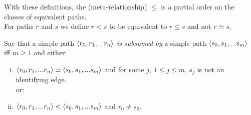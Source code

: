 \noindent With these definitions,  the (meta-relationship) $\leq$ is a partial order on the classes of equivalent paths. \\

\noindent For paths $r$ and $s$ we define $r < s$ to be equivalent to $r \leq s$ and not $r \simeq s$. \\


\begin{definition}
Say that a simple path $\langle r_0,r_1,...r_n\rangle$ \textit{is subsumed by} a simple path 
$\langle s_0,s_1,...s_m\rangle$ iff $m \geq 1$ and either:
\begin{enumerate} [(i)]

\item $\langle r_0,r_1,...r_n\rangle \simeq  \langle s_0,s_1,...s_m\rangle$ and 
for some $j$, $1 \leq j \leq m$, $s_j$ is not an identifying edge. \\

 \hspace{1cm} or:
\item $\langle r_0,r_1,...r_n\rangle <  \langle s_0,s_1,...s_m\rangle$ and $r_0 \neq s_0$.
\end{enumerate}
\end{definition}

